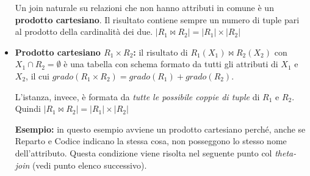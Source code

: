 \documentclass{article}
\begin{document}
\begin{itemize}
{{Un join naturale su relazioni che non hanno attributi in comune è un \textbf{prodotto cartesiano}. Il risultato contiene sempre un numero di tuple pari al prodotto della cardinalità dei due. $|R_1 \bowtie R_2| = |R_1| \times |R_2|$

}
}


\item \textbf{Prodotto cartesiano $R_1\times R_2$:} il risultato di $R_1(X_1) \bowtie R_2(X_2)$ con $X_1 \cap R_2 = \emptyset$ è una tabella con schema formato da tutti gli attributi di $X_1$ e $X_2$, il cui $grado (R_1 \times R_2) = grado(R_1) + grado(R_2)$. 

L'istanza, invece, è formata da \textit{tutte le possibile coppie di tuple} di $R_1$ e $R_2$. Quindi 
$|R_1 \bowtie R_2| = |R_1| \times |R_2|$

\newpage
\textbf{Esempio:} in questo esempio avviene un prodotto cartesiano perché, anche se Reparto e Codice indicano la stessa cosa, non posseggono lo stesso nome dell'attributo. Questa condizione viene risolta nel seguente punto col \textit{theta-join} (vedi punto elenco successivo).


\end{itemize}
\end{document}
